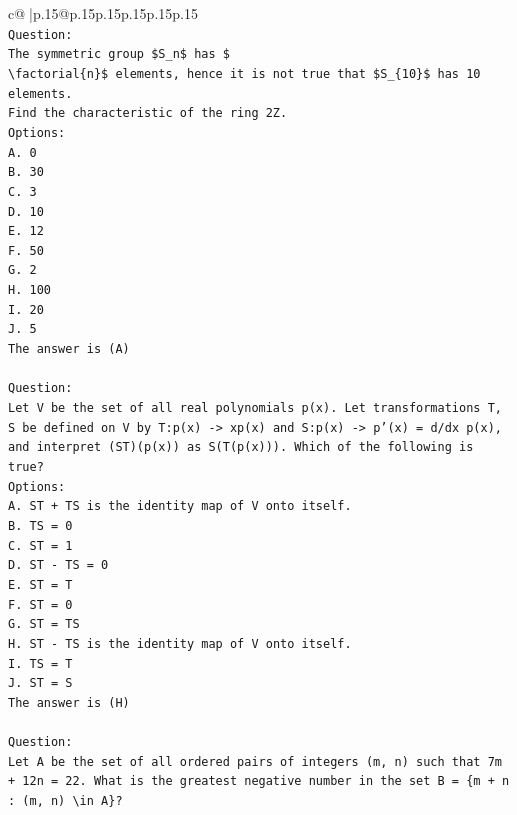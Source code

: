 \documentclass{article}
\begin{document}
{\begin{supertabular}{c@{$\;$}|p{.15\linewidth}@{}p{.15\linewidth}p{.15\linewidth}p{.15\linewidth}p{.15\linewidth}p{.15\linewidth}}
{{{\\ 
\texttt{Question:} \\
\texttt{The symmetric group \$S\_n\$ has \$} \\
\texttt{\textbackslash{}factorial\{n\}\$ elements, hence it is not true that \$S\_\{10\}\$ has 10 elements.} \\
\texttt{Find the characteristic of the ring 2Z.} \\
\texttt{Options:} \\
\texttt{A. 0} \\
\texttt{B. 30} \\
\texttt{C. 3} \\
\texttt{D. 10} \\
\texttt{E. 12} \\
\texttt{F. 50} \\
\texttt{G. 2} \\
\texttt{H. 100} \\
\texttt{I. 20} \\
\texttt{J. 5} \\
\texttt{The answer is (A)} \\
\\ 
\texttt{Question:} \\
\texttt{Let V be the set of all real polynomials p(x). Let transformations T, S be defined on V by T:p(x) {-}> xp(x) and S:p(x) {-}> p'(x) = d/dx p(x), and interpret (ST)(p(x)) as S(T(p(x))). Which of the following is true?} \\
\texttt{Options:} \\
\texttt{A. ST + TS is the identity map of V onto itself.} \\
\texttt{B. TS = 0} \\
\texttt{C. ST = 1} \\
\texttt{D. ST {-} TS = 0} \\
\texttt{E. ST = T} \\
\texttt{F. ST = 0} \\
\texttt{G. ST = TS} \\
\texttt{H. ST {-} TS is the identity map of V onto itself.} \\
\texttt{I. TS = T} \\
\texttt{J. ST = S} \\
\texttt{The answer is (H)} \\
\\ 
\texttt{Question:} \\
\texttt{Let A be the set of all ordered pairs of integers (m, n) such that 7m + 12n = 22. What is the greatest negative number in the set B = \{m + n : (m, n) \textbackslash{}in A\}?} \\
}}}
\end{supertabular}}
\end{document}
